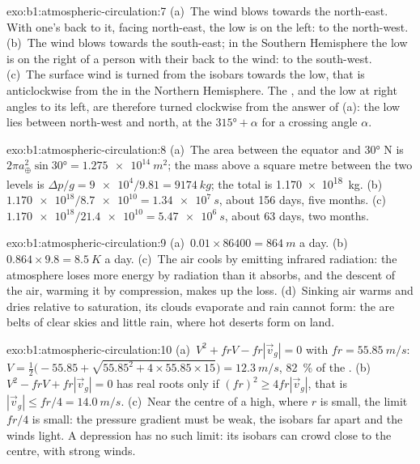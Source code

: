 \begin{solution}{exo:b1:atmospheric-circulation:7}
(a)~The wind blows towards the north-east. With one's back to it, facing north-east,
the low is on the left: to the north-west. (b)~The wind blows towards the
south-east; in the Southern Hemisphere the low is on the right of a person with
their back to the wind: to the south-west. (c)~The surface wind is turned from the
isobars towards the low, that is anticlockwise from the  in the
Northern Hemisphere. The , and the low at right angles to its left,
are therefore turned clockwise from the answer of (a): the low lies between
north-west and north, at the  $\ang{315} + \alpha$ for a crossing angle
$\alpha$.
\end{solution}

\begin{solution}{exo:b1:atmospheric-circulation:8}
(a)~The area between the equator and \ang{30} N is $2\pi a_\oplus^2\sin\ang{30} =
\qty{1.275e14}{m^2}$; the mass above a square metre between the two levels is
$\Delta p/g = \num{9e4}/9.81 = \qty{9174}{kg}$; the total is
\qty{1.170e18}{kg}. (b)~$\num{1.170e18}/\num{8.7e10} = \qty{1.34e7}{s}$, about
\num{156} days, five months. (c)~$\num{1.170e18}/\num{21.4e10} = \qty{5.47e6}{s}$,
about \num{63} days, two months.
\end{solution}

\begin{solution}{exo:b1:atmospheric-circulation:9}
(a)~$\num{0.01} \times \num{86400} = \qty{864}{m}$ a day. (b)~$0.864 \times 9.8 =
\qty{8.5}{K}$ a day. (c)~The air cools by emitting infrared radiation: the
atmosphere loses more energy by radiation than it absorbs, and the descent of the
air, warming it by compression, makes up the loss. (d)~Sinking air warms and dries
relative to saturation, its clouds evaporate and rain cannot form: the  are belts of clear skies and little rain, where hot deserts form on land.
\end{solution}

\begin{solution}{exo:b1:atmospheric-circulation:10}
(a)~$V^2 + frV - fr|\vec v_g| = 0$ with $fr = \qty{55.85}{m/s}$:
$V = \tfrac12\bigl(-55.85 + \sqrt{55.85^2 + 4 \times 55.85 \times 15}\bigr) =
\qty{12.3}{m/s}$, \qty{82}{\percent} of the . (b)~$V^2 - frV +
fr|\vec v_g| = 0$ has real roots only if $(fr)^2 \geq 4fr|\vec v_g|$, that is
$|\vec v_g| \leq fr/4 = \qty{14.0}{m/s}$. (c)~Near the centre of a high, where $r$ is
small, the limit $fr/4$ is small: the pressure gradient must be weak, the isobars far
apart and the winds light. A depression has no such limit: its isobars can crowd
close to the centre, with strong winds.
\end{solution}

